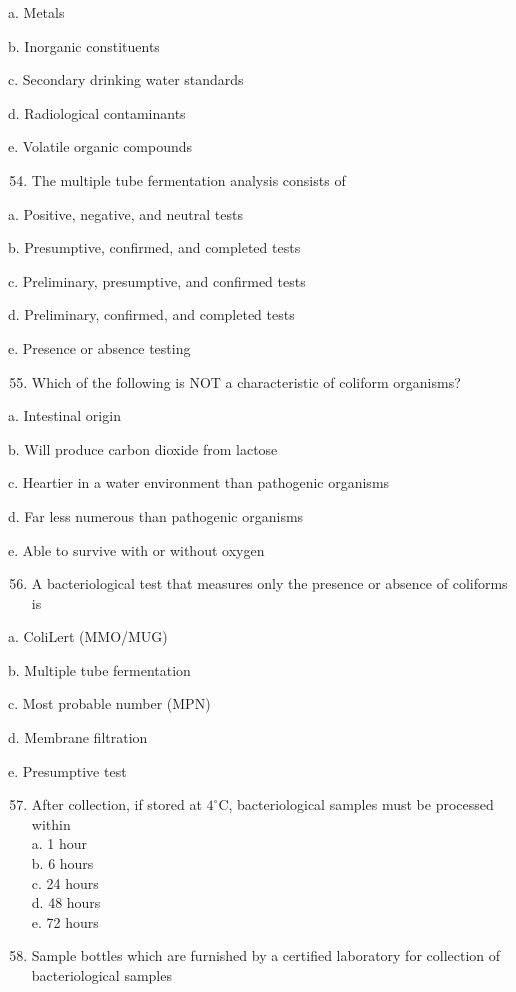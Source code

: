 \documentclass[10pt]{article}
\begin{document}
a. Metals

b. Inorganic constituents

c. Secondary drinking water standards

d. Radiological contaminants

e. Volatile organic compounds

\begin{enumerate}
  \setcounter{enumi}{53}
  \item The multiple tube fermentation analysis consists of
\end{enumerate}

a. Positive, negative, and neutral tests

b. Presumptive, confirmed, and completed tests

c. Preliminary, presumptive, and confirmed tests

d. Preliminary, confirmed, and completed tests

e. Presence or absence testing

\begin{enumerate}
  \setcounter{enumi}{54}
  \item Which of the following is NOT a characteristic of coliform organisms?
\end{enumerate}

a. Intestinal origin

b. Will produce carbon dioxide from lactose

c. Heartier in a water environment than pathogenic organisms

d. Far less numerous than pathogenic organisms

e. Able to survive with or without oxygen

\begin{enumerate}
  \setcounter{enumi}{55}
  \item A bacteriological test that measures only the presence or absence of coliforms is
\end{enumerate}

a. ColiLert (MMO/MUG)

b. Multiple tube fermentation

c. Most probable number (MPN)

d. Membrane filtration

e. Presumptive test

\begin{enumerate}
  \setcounter{enumi}{56}
  \item After collection, if stored at $4^{\circ} \mathrm{C}$, bacteriological samples must be processed within\\
a. 1 hour\\
b. 6 hours\\
c. 24 hours\\
d. 48 hours\\
e. 72 hours\\

  \item Sample bottles which are furnished by a certified laboratory for collection of bacteriological samples

\end{enumerate}
\end{document}
